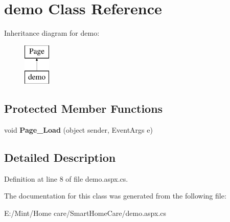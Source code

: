 \hypertarget{classdemo}{\section{demo Class Reference}
\label{classdemo}
}
Inheritance diagram for demo\-:\begin{figure}[H]
\begin{center}
\leavevmode
\includegraphics[height=2.000000cm]{classdemo}
\end{center}
\end{figure}
\subsection*{Protected Member Functions}
\begin{DoxyCompactItemize}
\item 
\hypertarget{classdemo_afa5fed50cf7d575d3b9984aaf31c9e8f}{void {\bfseries Page\-\_\-\-Load} (object sender, Event\-Args e)}\label{classdemo_afa5fed50cf7d575d3b9984aaf31c9e8f}

\end{DoxyCompactItemize}


\subsection{Detailed Description}


Definition at line 8 of file demo.\-aspx.\-cs.



The documentation for this class was generated from the following file\-:\begin{DoxyCompactItemize}
\item 
E\-:/\-Mint/\-Home care/\-Smart\-Home\-Care/demo.\-aspx.\-cs\end{DoxyCompactItemize}
